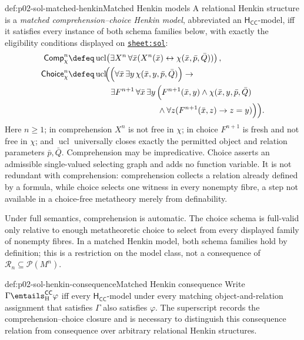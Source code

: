 \begin{hbdefinition}{def:p02-sol-matched-henkin}{Matched Henkin models}
A relational Henkin structure is a \emph{matched
comprehension--\allowbreak choice Henkin model}, abbreviated an
\(\mathsf{H}_{\mathsf{CC}}\)-model, iff it satisfies every instance of both
schema families below, with exactly the eligibility conditions displayed on
\hyperref[sheet:sol]{\texttt{sheet:sol}}:
\[
\begin{aligned}
\mathsf{Comp}_{\chi}^{n}&\defeq
 \operatorname{ucl}\!\left(\exists X^n\,\forall\bar x
   (X^n(\bar x)\leftrightarrow\chi(\bar x,\bar p,\bar Q))\right),\\
\mathsf{Choice}_{\chi}^{n}&\defeq
 \operatorname{ucl}\!\Bigl(\Bigl(\forall\bar x\,\exists y\,
 \chi(\bar x,y,\bar p,\bar Q)\Bigr)\to{}\\
&\hspace{18mm}\exists F^{n+1}\,\forall\bar x\,\exists y\,
 \Bigl(F^{n+1}(\bar x,y)\land\chi(\bar x,y,\bar p,\bar Q)\\
&\hspace{38mm}\land
 \forall z(F^{n+1}(\bar x,z)\to z=y)\Bigr)\Bigr).
\end{aligned}
\]
Here \(n\geq1\); in comprehension \(X^n\) is not free in \(\chi\);
in choice \(F^{n+1}\) is fresh and not free in \(\chi\); and
\(\operatorname{ucl}\) universally closes exactly the permitted object and
relation parameters \(\bar p,\bar Q\).  Comprehension may be impredicative.
Choice asserts an admissible single-valued selecting graph and adds no
function variable.  It is not redundant with comprehension: comprehension
collects a relation already defined by a formula, while choice selects one
witness in every nonempty fibre, a step not available in a choice-free
metatheory merely from definability.
\end{hbdefinition}

Under full semantics, comprehension is automatic.  The choice schema is
full-valid only relative to enough metatheoretic choice to select from every
displayed family of nonempty fibres.  In a matched Henkin model, both schema
families hold by definition; this is a restriction on the model class, not a
consequence of \(\mathcal R_n\subseteq\mathcal P(M^n)\).

\begin{hbdefinition}{def:p02-sol-henkin-consequence}{Matched Henkin consequence}
Write \(\Gamma\entails_{\mathrm H}^{\mathsf{CC}}\varphi\) iff every
\(\mathsf H_{\mathsf{CC}}\)-model under every matching object-and-relation
assignment that satisfies \(\Gamma\) also satisfies \(\varphi\).  The
superscript records the comprehension--choice closure and is necessary to
distinguish this consequence relation from consequence over arbitrary
relational Henkin structures.
\end{hbdefinition}

